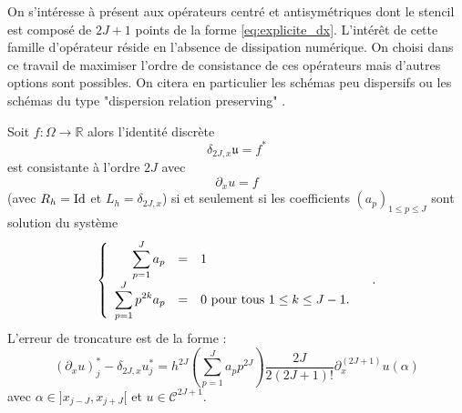 On s'intéresse à présent aux opérateurs centré et antisymétriques dont le stencil est composé de $2J+1$ points de la forme \eqref{eq:explicite_dx}. L'intérêt de cette famille d'opérateur réside en l'absence de dissipation numérique. On choisi dans ce travail de maximiser l'ordre de consistance de ces opérateurs mais d'autres options sont possibles. On citera en particulier les schémas peu dispersifs \cite{Bogey2004} ou les schémas du type "dispersion relation preserving" \cite{Tam1993}.

\begin{theoreme}
Soit $f : \Omega \rightarrow \mathbb{R}$ alors l'identité discrète
\begin{equation}
\delta_{2J,x} \mathfrak{u} = f^*
\end{equation}
est consistante à l'ordre $2J$ avec 
\begin{equation}
\partial_x u = f
\end{equation}
(avec $R_h = \text{Id}$ et $L_h = \delta_{2J,x}$) si et seulement si les coefficients $(a_p)_{1 \leq p \leq J}$ sont solution du système
\begin{equation}
\left\lbrace
\begin{array}{rcll}
\displaystyle\sum\limits_{p=1}^J a_p & = & 1 & \\
\displaystyle\sum\limits_{p=1}^J p^{2k} a_p & = & 0 \text{ pour tous } 1 \leq k \leq J-1.
\end{array}
\right. .
\label{eq:syst_opexplicite_P}
\end{equation}
L'erreur de troncature est de la forme :
\begin{equation}
\left(\partial_x u \right)_j^* - \delta_{2J,x} u^*_j = h^{2J} \left(  \sum_{p=1}^J a_p p^{2J} \right) \dfrac{2J}{2(2J+1)!} \partial^{(2J+1)}_x u(\alpha)
\end{equation} 
avec $\alpha \in ]x_{j-J}, x_{j+J}[$ et $u \in \mathcal{C}^{2J+1}$.
\label{th:consistance_delta_x_explicite}
\end{theoreme}


